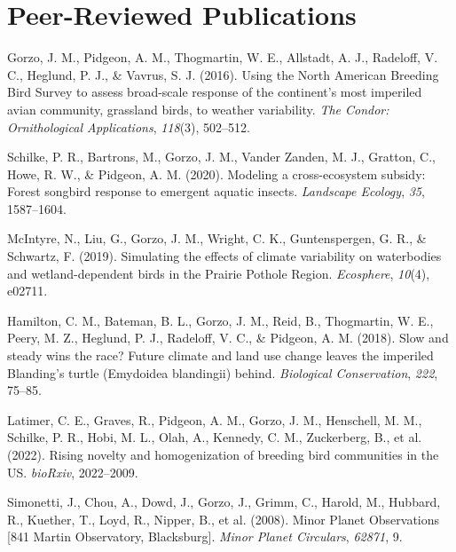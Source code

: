 \documentclass[11pt,a4paper,]{awesome-cv}
\newlength{\cslhangindent}
\newenvironment{CSLReferences}[2] %
 {\begin{list}{}{%
  \setlength{\itemindent}{0pt}
  \setlength{\leftmargin}{0pt}
  \setlength{\parsep}{0pt}
  \ifodd #1
   \setlength{\leftmargin}{\cslhangindent}
   \setlength{\itemindent}{-1\cslhangindent}
  \fi
  \setlength{\itemsep}{#2\baselineskip}}}
 {\end{list}}
\begin{document}
\section{Peer-Reviewed Publications}\label{peer-reviewed-publications}

\label{refs-e27578b494d3bed8953c36fb56189219}
\begin{CSLReferences}{1}{0}
Gorzo, J. M., Pidgeon, A. M., Thogmartin, W. E., Allstadt, A. J.,
Radeloff, V. C., Heglund, P. J., \& Vavrus, S. J. (2016). Using the
North American Breeding Bird Survey to assess broad-scale response of
the continent's most imperiled avian community, grassland birds, to
weather variability. \emph{The Condor: Ornithological Applications},
\emph{118}(3), 502--512.

Schilke, P. R., Bartrons, M., Gorzo, J. M., Vander Zanden, M. J.,
Gratton, C., Howe, R. W., \& Pidgeon, A. M. (2020). Modeling a
cross-ecosystem subsidy: Forest songbird response to emergent aquatic
insects. \emph{Landscape Ecology}, \emph{35}, 1587--1604.

McIntyre, N., Liu, G., Gorzo, J. M., Wright, C. K., Guntenspergen, G.
R., \& Schwartz, F. (2019). Simulating the effects of climate
variability on waterbodies and wetland-dependent birds in the Prairie
Pothole Region. \emph{Ecosphere}, \emph{10}(4), e02711.

Hamilton, C. M., Bateman, B. L., Gorzo, J. M., Reid, B., Thogmartin, W.
E., Peery, M. Z., Heglund, P. J., Radeloff, V. C., \& Pidgeon, A. M.
(2018). Slow and steady wins the race? Future climate and land use
change leaves the imperiled Blanding's turtle (Emydoidea blandingii)
behind. \emph{Biological Conservation}, \emph{222}, 75--85.

Latimer, C. E., Graves, R., Pidgeon, A. M., Gorzo, J. M., Henschell, M.
M., Schilke, P. R., Hobi, M. L., Olah, A., Kennedy, C. M., Zuckerberg,
B., et al. (2022). Rising novelty and homogenization of breeding bird
communities in the US. \emph{bioRxiv}, 2022--2009.

Simonetti, J., Chou, A., Dowd, J., Gorzo, J., Grimm, C., Harold, M.,
Hubbard, R., Kuether, T., Loyd, R., Nipper, B., et al. (2008). Minor
Planet Observations {[}841 Martin Observatory, Blacksburg{]}.
\emph{Minor Planet Circulars}, \emph{62871}, 9.

\end{CSLReferences}
\end{document}
